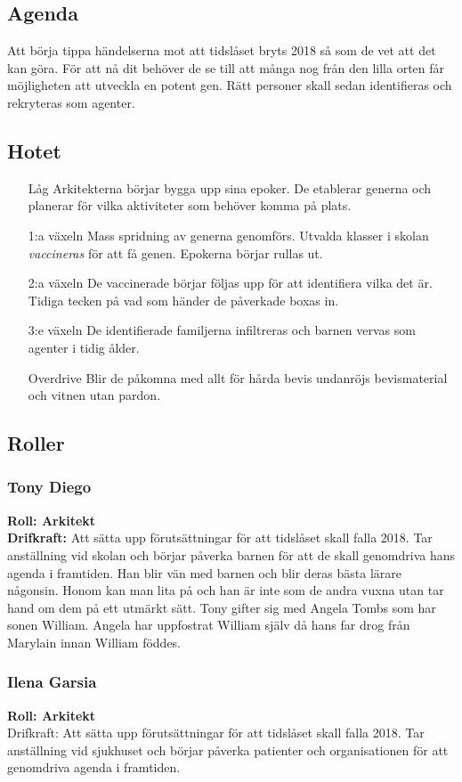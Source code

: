 \documentclass[a5paper,10pt]{report}
\begin{document}
\subsection{Agenda}
Att börja tippa händelserna mot att tidslåset bryts 2018 så som de vet att det kan göra. För att nå dit behöver de se till att många nog från den lilla orten får möjligheten att utveckla en potent gen. Rätt personer skall sedan identifieras och rekryteras som agenter.
\subsection{Hotet}
\begin{itemize}
  \item[Låg] Arkitekterna börjar bygga upp sina epoker. De etablerar generna och planerar för vilka aktiviteter som behöver komma på plats.
  \item[1:a växeln] Mass spridning av generna genomförs. Utvalda klasser i skolan \textit{vaccineras} för att få genen. Epokerna börjar rullas ut.
  \item[2:a växeln] De vaccinerade börjar följas upp för att identifiera vilka det är. Tidiga tecken på vad som händer de påverkade boxas in.
  \item[3:e växeln] De identifierade familjerna infiltreras och barnen vervas som agenter i tidig ålder.
  \item[Overdrive] Blir de påkomna med allt för hårda bevis undanröjs bevismaterial och vitnen utan pardon.
\end{itemize}
\subsection{Roller}
\subsubsection{Tony Diego}
\textbf{Roll: Arkitekt}\\
\textbf{Drifkraft:} Att sätta upp förutsättningar för att tidslåset skall falla 2018. Tar anställning vid skolan och börjar påverka barnen för att de skall genomdriva hans agenda i framtiden. Han blir vän med barnen och blir deras bästa lärare någonsin. Honom kan man lita på och han är inte som de andra vuxna utan tar hand om dem på ett utmärkt sätt. Tony gifter sig med Angela Tombs som har sonen William. Angela har uppfostrat William själv då hans far drog från Marylain innan William föddes.
\subsubsection{Ilena Garsia}
\textbf{Roll: Arkitekt}\\
Drifkraft: Att sätta upp förutsättningar för att tidslåset skall falla 2018. Tar anställning vid sjukhuset och börjar påverka patienter och organisationen för att genomdriva agenda i framtiden.
\end{document}
